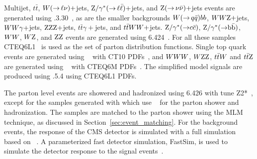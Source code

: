 Multijet, $t\bar{t}$, $W({\rightarrow}\,\ell\nu)+$jets, $\mathrm{Z}/\gamma^*({\rightarrow}\,
\ell\bar{\ell})+$jets, and $\mathrm{Z}({\rightarrow}\, \nu \bar{\nu})+$jets events are generated using
.3.30~\cite{Alwall:2011uj}, as are the smaller backgrounds $W({\rightarrow}\, q
\bar{q})bb$, 
$WW\mathrm{Z}+$jets, $WW\gamma+$jets, $\mathrm{Z}\mathrm{Z}\mathrm{Z}+$jets, $t\bar{t}\gamma+$jets, and
$t\bar{t}WW+$jets.
$\mathrm{Z}/\gamma^*({\rightarrow} c\bar{c})$, $\mathrm{Z}/\gamma^*({\rightarrow} \mathrm{b}\bar{\mathrm{b}})$,
$WW$, $W\mathrm{Z}$, and $\mathrm{Z}\mathrm{Z}$ events are generated using 
{\PYTHIA}6.424~\cite{Sjostrand:2006za}.
For all these samples CTEQ6L1~\cite{Pumplin:2002vw} is used as the set of parton distribution
functions. 
Single top quark events are generated using ~\cite{powheg,powheg2} with CT10
PDFs~\cite{Lai:2010vv}, and $WWW$, $W\mathrm{Z}\mathrm{Z}$, $t\bar{t}W$ and $t\bar{t}\mathrm{Z}$ are generated using
\AMCATNLO~\cite{Frixione:2002ik} with CTEQ6M PDFs~\cite{Pumplin:2002vw}. 
The simplified model signals are produced using .5.4 using CTEQ6L1 PDFs.  

The parton level events are showered and hadronized using {\PYTHIA}6.426 with tune
Z2*~\cite{Chatrchyan:2013gfi}, except for the samples generated with \AMCATNLO which use 
\HERWIG~\cite{Corcella:2000bw,Corcella:2002jc} for the parton shower and hadronization.  
The \MADGRAPH samples are matched to the parton shower using the MLM technique, as discussed
in Section~\ref{sec:event_matching}.
For the background events, the response of the CMS detector is
simulated with a full simulation based on \GEANTfour~\cite{G4}.  A parameterized fast detector
simulation, \ie FastSim, is used to simulate the detector response to the signal
events~\cite{fastsim}. 

